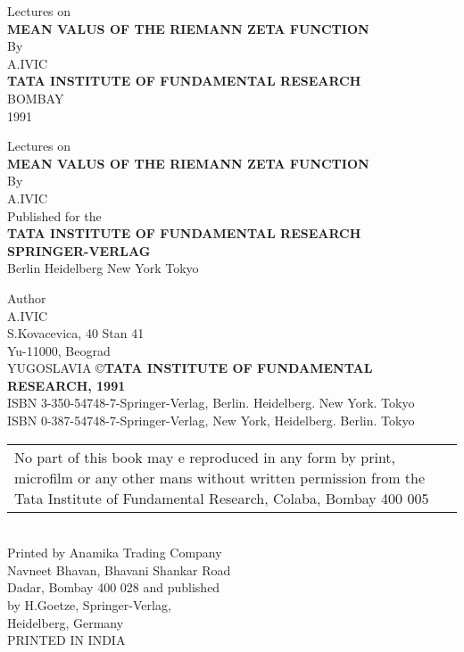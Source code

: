 \thispagestyle{empty}
\begin{center}
  Lectures on \\[10pt]
  \textbf{\Large MEAN VALUS OF THE RIEMANN ZETA FUNCTION}\\[50pt]

By\\[10pt]
A.IVIC\\
\vfill
\textbf{\Large TATA INSTITUTE OF FUNDAMENTAL RESEARCH}\\
BOMBAY\\
1991
\end{center}
\newpage

\thispagestyle{empty}
\begin{center}
  Lectures on \\[10pt]
  \textbf{\Large MEAN VALUS OF THE RIEMANN ZETA FUNCTION}\\[50pt]

By\\[10pt]
A.IVIC\\
\vfill
Published for the \\
\textbf{\Large TATA INSTITUTE OF FUNDAMENTAL RESEARCH}\\
\textbf{SPRINGER-VERLAG}\\
Berlin Heidelberg New York Tokyo
\end{center}
\newpage

\begin{center}
Author\\
A.IVIC\\
S.Kovacevica, 40 Stan 41\\
Yu-11000, Beograd\\
YUGOSLAVIA
\vfill
\copyright \quad \textbf{TATA INSTITUTE OF FUNDAMENTAL RESEARCH, 1991}\\[10pt]
ISBN 3-350-54748-7-Springer-Verlag, Berlin. Heidelberg. New
York. Tokyo\\
ISBN 0-387-54748-7-Springer-Verlag, New York,
Heidelberg. Berlin. Tokyo\\[20pt]
\begin{tabular}{p{8cm}}
No part of this book may e reproduced in any form by print, microfilm
or any other mans without written permission from the Tata Institute
of Fundamental Research, Colaba, Bombay 400 005
\end{tabular}\\[20pt]

Printed by Anamika Trading Company \\
Navneet Bhavan, Bhavani Shankar Road\\
Dadar, Bombay 400 028 and published\\
by H.Goetze, Springer-Verlag,\\
Heidelberg, Germany\\[5pt]
PRINTED IN INDIA

\end{center}
\newpage
